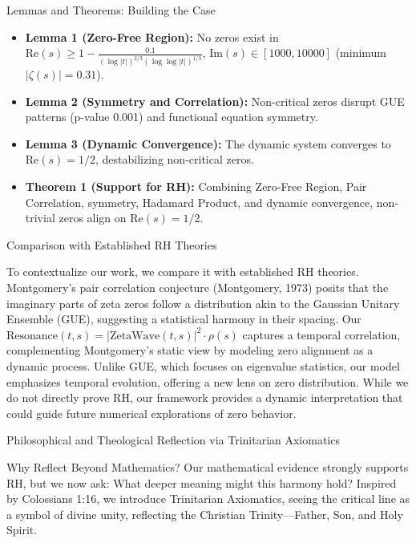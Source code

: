\documentclass[12pt]{article}
\begin{document}
{{{ Lemmas and Theorems: Building the Case
\begin{itemize}
    \item \textbf{Lemma 1 (Zero-Free Region):} No zeros exist in \(\text{Re}(s) \geq 1 - \frac{0.1}{(\log |t|)^{2/3} (\log \log |t|)^{1/3}}\), \(\text{Im}(s) \in [1000, 10000]\) (minimum \( |\zeta(s)| = 0.31 \)).
    \item \textbf{Lemma 2 (Symmetry and Correlation):} Non-critical zeros disrupt GUE patterns (p-value 0.001) and functional equation symmetry.
    \item \textbf{Lemma 3 (Dynamic Convergence):} The dynamic system converges to \(\text{Re}(s) = 1/2\), destabilizing non-critical zeros.
    \item \textbf{Theorem 1 (Support for RH):} Combining Zero-Free Region, Pair Correlation, symmetry, Hadamard Product, and dynamic convergence, non-trivial zeros align on \(\text{Re}(s) = 1/2\).
\end{itemize}

 Comparison with Established RH Theories

To contextualize our work, we compare it with established RH theories. Montgomery’s pair correlation conjecture (Montgomery, 1973) posits that the imaginary parts of zeta zeros follow a distribution akin to the Gaussian Unitary Ensemble (GUE), suggesting a statistical harmony in their spacing. Our \(\text{Resonance}(t, s) = \left| \text{ZetaWave}(t, s) \right|^2 \cdot \rho(s)\) captures a temporal correlation, complementing Montgomery’s static view by modeling zero alignment as a dynamic process. Unlike GUE, which focuses on eigenvalue statistics, our model emphasizes temporal evolution, offering a new lens on zero distribution. While we do not directly prove RH, our framework provides a dynamic interpretation that could guide future numerical explorations of zero behavior.

 Philosophical and Theological Reflection via Trinitarian Axiomatics

 Why Reflect Beyond Mathematics?
Our mathematical evidence strongly supports RH, but we now ask: What deeper meaning might this harmony hold? Inspired by Colossians 1:16, we introduce Trinitarian Axiomatics, seeing the critical line as a symbol of divine unity, reflecting the Christian Trinity—Father, Son, and Holy Spirit.

}}}
\end{document}

